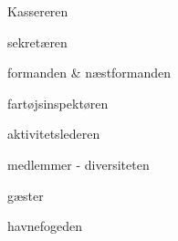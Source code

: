 Kassereren

sekretæren

formanden & næstformanden

fartøjsinspektøren

aktivitetslederen

medlemmer - diversiteten

gæster

havnefogeden